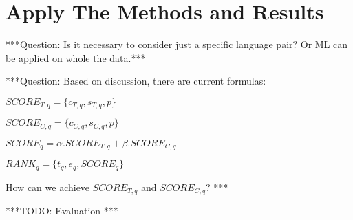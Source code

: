 \section{Apply The Methods and Results}
\label{sec:apply}
***Question: Is it necessary to consider just a specific language pair? Or ML can be applied on whole the data.***

***Question: Based on discussion, there are current formulas:
\begin{center}
$SCORE_{T,q} = \{ c_{T,q}, s_{T,q}, p \}$ \\
\end{center}
\begin{center}
$SCORE_{C,q} = \{ c_{C,q}, s_{C,q}, p \}$ \\
\end{center}
\begin{center}
$SCORE_{q} = \alpha.SCORE_{T,q} + \beta.SCORE_{C,q}$ \\
\end{center}
\begin{center}
$RANK_{q} = \{ t_q, e _q, SCORE_q \}$ \\
\end{center}

How can we achieve $SCORE_{T,q}$ and $SCORE_{C,q}$?
***

***TODO: Evaluation ***